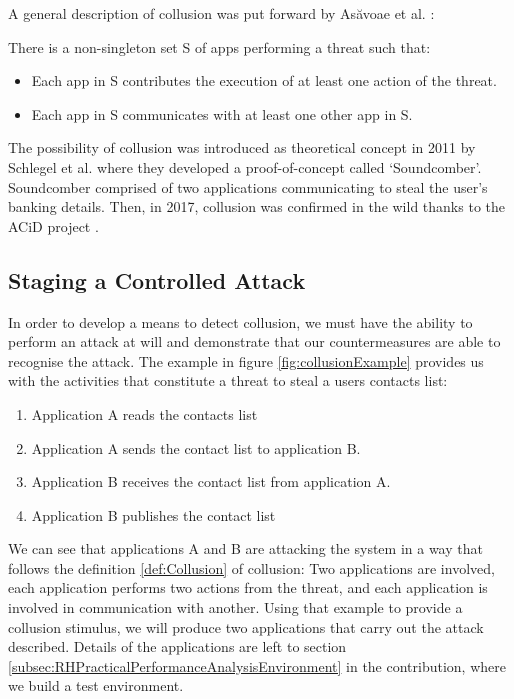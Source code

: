\noindent
A general description of collusion was put forward by As{\u a}voae et al. \cite{DetectingMaliciousCollusion}:\\

\begin{definition}
\label{def:Collusion}
There is a non-singleton set S of apps performing a threat such that:

\begin{itemize}

\item Each app in S contributes the execution of at least one action of the threat.
\item Each app in S communicates with at least one other app in S. 

\end{itemize}
\end{definition}

\noindent
The possibility of collusion was introduced as theoretical concept in 2011 by Schlegel et al. \cite{Soundcomber} where they developed a proof-of-concept called `Soundcomber'.  Soundcomber comprised of two applications communicating to steal the user's banking details.   Then, in 2017, collusion was confirmed in the wild thanks to the ACiD project \cite{ACiDProject}.

\subsection{Staging a Controlled Attack}
\label{sebsec:PerformingAControlledAttack}

In order to develop a means to detect collusion, we must have the ability to perform an attack at will and demonstrate that our countermeasures are able to recognise the attack.  The example in figure \ref{fig:collusionExample} provides us with the activities that constitute a threat to steal a users contacts list:

\begin{enumerate}
\item Application A reads the contacts list
\item Application A sends the contact list to application B.
\item Application B receives the contact list from application A.
\item Application B publishes the contact list
\end{enumerate}

We can see that applications A and B are attacking the system in a way that follows the definition \ref{def:Collusion} of collusion:  Two applications are involved, each application performs two actions from the threat, and each application is involved in communication with another.  Using that example to provide a collusion stimulus, we will produce two applications that carry out the attack described.  Details of the applications are left to section \ref{subsec:RHPracticalPerformanceAnalysisEnvironment} in the contribution, where we build a test environment.

